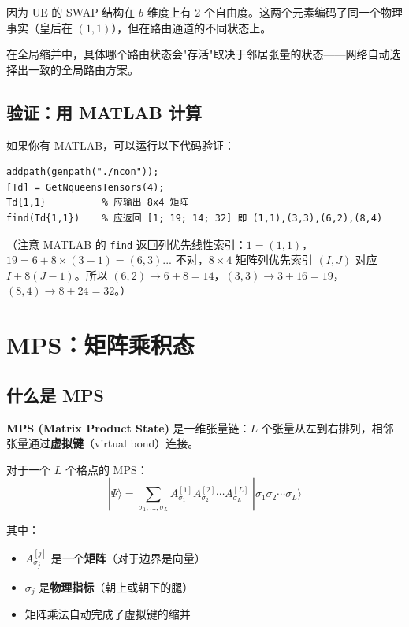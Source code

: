 \documentclass[12pt,a4paper]{article}
\begin{document}
\begin{sumbox}
因为 UE 的 SWAP 结构在 $b$ 维度上有 2 个自由度。这两个元素编码了同一个物理事实（皇后在 $(1,1)$），但在路由通道的不同状态上。

在全局缩并中，具体哪个路由状态会"存活"取决于邻居张量的状态——网络自动选择出一致的全局路由方案。
\end{sumbox}

\subsection{验证：用 MATLAB 计算}

如果你有 MATLAB，可以运行以下代码验证：
\begin{verbatim}
addpath(genpath("./ncon"));
[Td] = GetNqueensTensors(4);
Td{1,1}          % 应输出 8x4 矩阵
find(Td{1,1})    % 应返回 [1; 19; 14; 32] 即 (1,1),(3,3),(6,2),(8,4)
\end{verbatim}

（注意 MATLAB 的 \texttt{find} 返回列优先线性索引：$1 = (1,1)$，$19 = 6+8\times(3-1) = (6,3)$... 不对，$8\times 4$ 矩阵列优先索引 $(I,J)$ 对应 $I + 8(J-1)$。所以 $(6,2) \to 6+8=14$，$(3,3) \to 3+16=19$，$(8,4) \to 8+24=32$。\checkmark）


\section{MPS：矩阵乘积态}

\subsection{什么是 MPS}

\begin{keybox}
\textbf{MPS (Matrix Product State)} 是一维张量链：$L$ 个张量从左到右排列，相邻张量通过\textbf{虚拟键}（virtual bond）连接。

对于一个 $L$ 个格点的 MPS：
$$|\Psi\rangle = \sum_{\sigma_1,\ldots,\sigma_L} A^{[1]}_{\sigma_1} A^{[2]}_{\sigma_2} \cdots A^{[L]}_{\sigma_L} \; |\sigma_1 \sigma_2 \cdots \sigma_L\rangle$$

其中：
\begin{itemize}
  \item $A^{[j]}_{\sigma_j}$ 是一个\textbf{矩阵}（对于边界是向量）
  \item $\sigma_j$ 是\textbf{物理指标}（朝上或朝下的腿）
  \item 矩阵乘法自动完成了虚拟键的缩并
\end{itemize}
\end{keybox}
\end{document}
